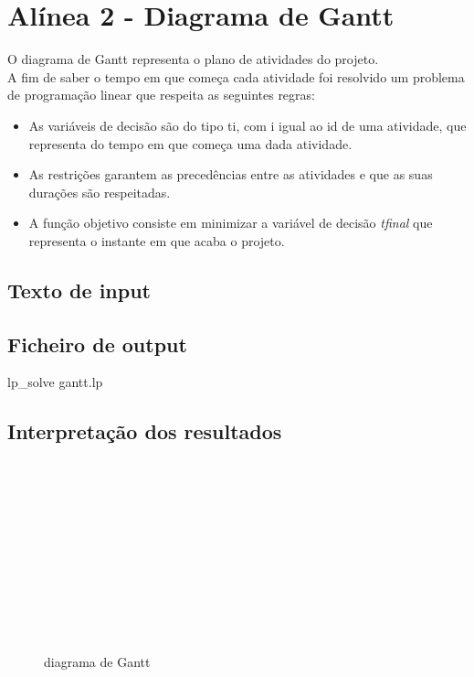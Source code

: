 \documentclass[a4paper]{report}
\begin{document}
\pagebreak
\section{Alínea 2 - Diagrama de Gantt}
O diagrama de Gantt representa o plano de atividades do projeto.\\
A fim de saber o tempo em que começa cada atividade foi resolvido um problema de
programação linear que respeita as seguintes regras:
\begin{itemize}
    \item As variáveis de decisão são do tipo ti, com i igual ao id de uma
        atividade, que representa do tempo em que começa uma dada atividade.
    \item As restrições garantem as precedências entre as atividades e que as
        suas durações são respeitadas.
    \item A função objetivo consiste em  minimizar a variável de decisão
        \textit{tfinal} que representa o instante em que acaba o projeto.
\end{itemize}

\subsection{Texto de input}


\pagebreak
\subsection{Ficheiro de output}
\bash[stdout]
lp_solve gantt.lp
\END


\subsection{Interpretação dos resultados}
\begin{figure}[H]
    \centering
    \begin{ganttchart}{1}{27}
        \\
        \\

        \\
        \\
        \\
        
        \\
        \\
        
        \\
        
        \\
        
        \\
    \end{ganttchart}
    \caption{diagrama de Gantt}
\end{figure}
\end{document}
